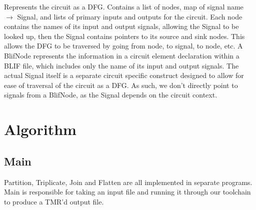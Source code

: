 \documentclass[12pt,final,oneside]{dwThesis} %
\begin{document}
   Represents the circuit as a DFG. Contains a list of nodes, map of signal name $\to$ Signal, and lists of primary inputs and outputs for the circuit.
   Each node contains the names of its input and output signals, allowing the Signal to be looked up, then the Signal contains pointers to its source and sink nodes.
   This allows the DFG to be traversed by going from node, to signal, to node, etc.
   A BlifNode represents the information in a circuit element declaration within a \gls{BLIF} file, which includes only the name of its input and output signals. The actual Signal itself is a separate circuit specific construct designed to allow for ease of traversal of the circuit as a \gls{DFG}.
   As such, we don't directly point to signals from a BlifNode, as the Signal depends on the circuit context.

   \newpage
   \section{Algorithm}\label{secAlgorithm}
   \subsection{Main}
   Partition, Triplicate, Join and Flatten are all implemented in separate programs. Main is responsible for taking an input file and running it through our toolchain to produce a TMR'd output file.
\end{document}
